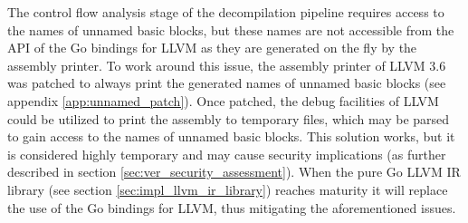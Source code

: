 The control flow analysis stage of the decompilation pipeline requires access to the names of unnamed basic blocks, but these names are not accessible from the API of the Go bindings for LLVM as they are generated on the fly by the assembly printer. To work around this issue, the assembly printer of LLVM 3.6 was patched to always print the generated names of unnamed basic blocks (see appendix \ref{app:unnamed_patch}). Once patched, the debug facilities of LLVM could be utilized to print the assembly to temporary files, which may be parsed to gain access to the names of unnamed basic blocks. This solution works, but it is considered highly temporary and may cause security implications (as further described in section \ref{sec:ver_security_assessment}). When the pure Go LLVM IR library (see section \ref{sec:impl_llvm_ir_library}) reaches maturity it will replace the use of the Go bindings for LLVM, thus mitigating the aforementioned issues.

